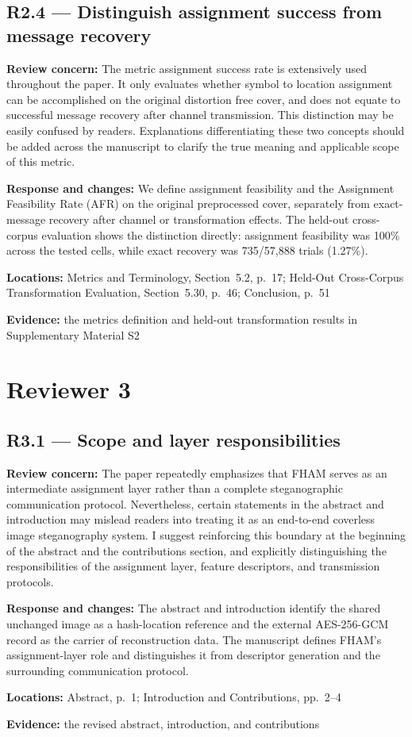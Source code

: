 \documentclass[12pt,a4paper]{article}
\newcommand{\revcomment}[1]{\par\medskip\noindent\textbf{Review concern:} #1\par\smallskip}
\newcommand{\responsechanges}[1]{\par\noindent\textbf{Response and changes:} #1\par}
\newcommand{\locations}[1]{\par\noindent\textbf{Locations:} #1\par}
\newcommand{\evidence}[1]{\par\noindent\textbf{Evidence:} #1\par\smallskip}
\begin{document}
\subsection*{R2.4 --- Distinguish assignment success from message recovery}

\revcomment{The metric assignment success rate is extensively used throughout the paper. It only evaluates whether symbol to location assignment can be accomplished on the original distortion free cover, and does not equate to successful message recovery after channel transmission. This distinction may be easily confused by readers. Explanations differentiating these two concepts should be added across the manuscript to clarify the true meaning and applicable scope of this metric.}
\responsechanges{We define assignment feasibility and the Assignment Feasibility Rate (AFR) on the original preprocessed cover, separately from exact-message recovery after channel or transformation effects. The held-out cross-corpus evaluation shows the distinction directly: assignment feasibility was 100\% across the tested cells, while exact recovery was 735/57,888 trials (1.27\%).}
\locations{Metrics and Terminology, Section~5.2, p.~17; Held-Out Cross-Corpus Transformation Evaluation, Section~5.30, p.~46; Conclusion, p.~51}
\evidence{the metrics definition and held-out transformation results in Supplementary Material S2}

\section*{Reviewer 3}

\subsection*{R3.1 --- Scope and layer responsibilities}

\revcomment{The paper repeatedly emphasizes that FHAM serves as an intermediate assignment layer rather than a complete steganographic communication protocol. Nevertheless, certain statements in the abstract and introduction may mislead readers into treating it as an end-to-end coverless image steganography system. I suggest reinforcing this boundary at the beginning of the abstract and the contributions section, and explicitly distinguishing the responsibilities of the assignment layer, feature descriptors, and transmission protocols.}
\responsechanges{The abstract and introduction identify the shared unchanged image as a hash-location reference and the external AES-256-GCM record as the carrier of reconstruction data. The manuscript defines FHAM's assignment-layer role and distinguishes it from descriptor generation and the surrounding communication protocol.}
\locations{Abstract, p.~1; Introduction and Contributions, pp.~2--4}
\evidence{the revised abstract, introduction, and contributions}
\end{document}
